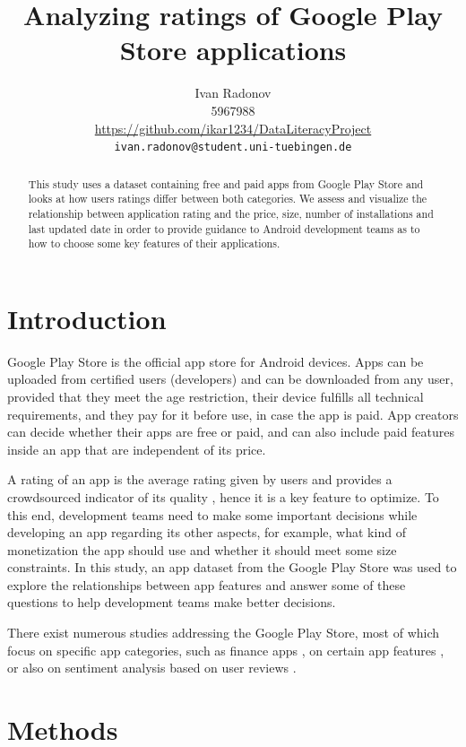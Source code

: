 \documentclass{article}
\title{Analyzing ratings of Google Play Store applications}
\author{%
  Ivan Radonov \\
  5967988 \\
  \url{https://github.com/ikar1234/DataLiteracyProject} \\
  \texttt{ivan.radonov@student.uni-tuebingen.de} \\
  }
\begin{document}
\maketitle

\begin{abstract}
  This study uses a dataset containing free and paid apps from Google Play Store and looks at how users ratings differ between both categories. We assess and visualize the relationship between application rating and the price, size, number of installations and last updated date in order to provide guidance to Android development teams as to how to choose some key features of their applications.
\end{abstract}

\section{Introduction}

Google Play Store is the official app store for Android devices. Apps can be uploaded from certified users (developers) and can be downloaded from any user, provided that they meet the age restriction, their device fulfills all technical requirements, and they pay for it before use, in case the app is paid. App creators can decide whether their apps are free or paid, and can also include paid features inside an app that are independent of its price.

A rating of an app is the average rating given by users and provides a crowdsourced indicator of its quality \cite{mobileapprating}, hence it is a key feature to optimize. To this end, development teams need to make some important decisions while developing an app regarding its other aspects, for example, what kind of monetization the app should use and whether it should meet some size constraints. In this study, an app dataset from the Google Play Store was used to explore the relationships between app features and answer some of these questions to help development teams make better decisions.

There exist numerous studies addressing the Google Play Store, most of which focus on specific app categories, such as finance apps \cite{financialapps}, on certain app features \cite{freshapps}, or also on sentiment analysis based on user reviews \cite{sentiment}.

\section{Methods}
\end{document}
